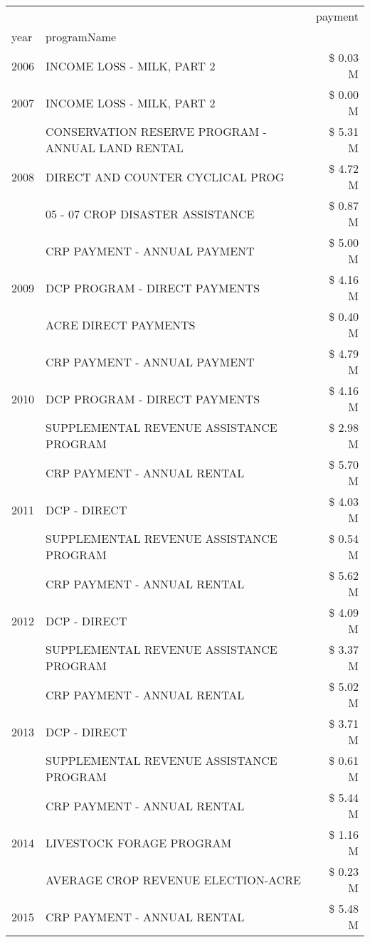 \begin{tabular}{llr}
\toprule
 &  & payment \\
year & programName &  \\
\midrule
2006 & INCOME LOSS - MILK, PART 2 & \$ 0.03 M \\
\cline{1-3}
2007 & INCOME LOSS - MILK, PART 2 & \$ 0.00 M \\
\cline{1-3}
\multirow[t]{3}{*}{2008} & CONSERVATION RESERVE PROGRAM - ANNUAL LAND RENTAL & \$ 5.31 M \\
 & DIRECT AND COUNTER CYCLICAL PROG & \$ 4.72 M \\
 & 05 - 07 CROP DISASTER ASSISTANCE & \$ 0.87 M \\
\cline{1-3}
\multirow[t]{3}{*}{2009} & CRP PAYMENT - ANNUAL PAYMENT & \$ 5.00 M \\
 & DCP PROGRAM - DIRECT PAYMENTS & \$ 4.16 M \\
 & ACRE DIRECT PAYMENTS & \$ 0.40 M \\
\cline{1-3}
\multirow[t]{3}{*}{2010} & CRP PAYMENT - ANNUAL PAYMENT & \$ 4.79 M \\
 & DCP PROGRAM - DIRECT PAYMENTS & \$ 4.16 M \\
 & SUPPLEMENTAL REVENUE ASSISTANCE PROGRAM & \$ 2.98 M \\
\cline{1-3}
\multirow[t]{3}{*}{2011} & CRP PAYMENT - ANNUAL RENTAL & \$ 5.70 M \\
 & DCP - DIRECT & \$ 4.03 M \\
 & SUPPLEMENTAL REVENUE ASSISTANCE PROGRAM & \$ 0.54 M \\
\cline{1-3}
\multirow[t]{3}{*}{2012} & CRP PAYMENT - ANNUAL RENTAL & \$ 5.62 M \\
 & DCP - DIRECT & \$ 4.09 M \\
 & SUPPLEMENTAL REVENUE ASSISTANCE PROGRAM & \$ 3.37 M \\
\cline{1-3}
\multirow[t]{3}{*}{2013} & CRP PAYMENT - ANNUAL RENTAL & \$ 5.02 M \\
 & DCP - DIRECT & \$ 3.71 M \\
 & SUPPLEMENTAL REVENUE ASSISTANCE PROGRAM & \$ 0.61 M \\
\cline{1-3}
\multirow[t]{3}{*}{2014} & CRP PAYMENT - ANNUAL RENTAL & \$ 5.44 M \\
 & LIVESTOCK FORAGE PROGRAM & \$ 1.16 M \\
 & AVERAGE CROP REVENUE ELECTION-ACRE & \$ 0.23 M \\
\cline{1-3}
\multirow[t]{3}{*}{2015} & CRP PAYMENT - ANNUAL RENTAL & \$ 5.48 M \\

\end{tabular}

